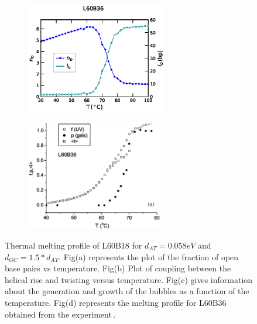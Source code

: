 \documentclass[12pt,masters,final]{UTRGVthesis}
\begin{document}
\begin{figure}[!h]
        \begin{subfigure}[b]{0.49\textwidth}
                \centering
                \includegraphics[height=1.9in, width=.8\textwidth]{L60B36_temp_bub.eps}
                \caption{}
                \label{fig:L60B36bub}
        \end{subfigure}%
        \begin{subfigure}[b]{0.49\textwidth}
                \centering
                \includegraphics[height=1.9in, width=.8\textwidth]{exp_L60B36.eps}
                \caption{}
                \label{fig:L60B36exp}
        \end{subfigure}%
       
       
\caption{Thermal melting profile of L60B18 for $d_{AT}=0.058 eV$ and $d_{GC}=1.5*d_{AT}$. Fig(a) represents the plot of the fraction of open base pairs vs temperature. Fig(b) Plot of coupling between the helical rise and twisting versus temperature. Fig(c) gives information about the generation and growth of the bubbles as a function of the temperature. Fig(d) represents the melting profile for L60B36 obtained from the experiment\protect\cite{zeng2003length}\,. } 
\label{fig:L60b36cal}    

\end{figure}
% 
\newpage
\end{document}
